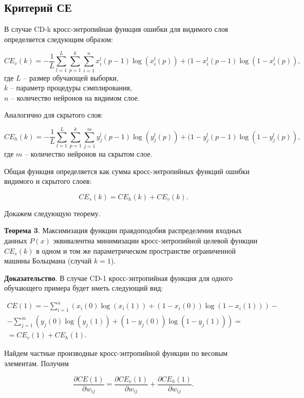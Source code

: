 \subsection{Критерий СЕ}

В случае CD-k кросс-энтропийная функция ошибки для видимого слоя определяется следующим образом:

\begin{equation*}
	CE_v(k) = -\frac{1}{L}\sum_{l=1}^L \sum_{p=1}^k \sum_{i=1}^n x_i^l(p-1)\log(x_i^l(p))+(1-x_i^l(p-1)\log(1-x_i^l(p)),
\end{equation*}
где $L$ -- размер обучающей выборки,\\
$k$ -- параметр процедуры сэмплирования,\\
$n$ -- количество нейронов на видимом слое.

Аналогично для скрытого слоя:

\begin{equation*}
	CE_h(k) = -\frac{1}{L}\sum_{l=1}^L \sum_{p=1}^k \sum_{j=1}^m y_j^l(p-1)\log(y_j^l(p))+(1-y_j^l(p-1)\log(1-y_j^l(p)),
\end{equation*}
где $m$ -- количество нейронов на скрытом слое.

Общая функция определяется как сумма кросс-энтропийных функций ошибки видимого и скрытого слоев:

\begin{equation}
	CE_s(k) = CE_h(k)+CE_v(k).
\end{equation}

Докажем следующую теорему.

\textbf{Теорема 3}. Максимизация функции правдоподобия распределения входных данных $P(x)$ эквивалентна минимизации кросс-энтропийной целевой функции $CE_s(k)$ в одном и том же параметрическом пространстве ограниченной машины Больцмана (случай $k=1$).

\textbf{Доказательство}. В случае CD-1 кросс-энтропийная функция для одного обучающего примера будет иметь следующий вид:

\begin{multline}
	CE(1) = -\sum_{i=1}^n (x_i(0)\log(x_i(1))+(1-x_i(0))\log(1-x_i(1)))-\\-\sum_{j=1}^m ( y_j(0)\log(y_j(1))+(1-y_j(0))\log(1-y_j(1))) = \\ = CE_v(1)+CE_h(1).
\end{multline}

Найдем частные производные кросс-энтропийной функции по весовым элементам. Получим

\begin{equation*}
	\frac{\partial CE(1)}{\partial w_{ij}} = \frac{\partial CE_v(1)}{\partial w_{ij}} + \frac{\partial CE_h(1)}{\partial w_{ij}}.
\end{equation*}

